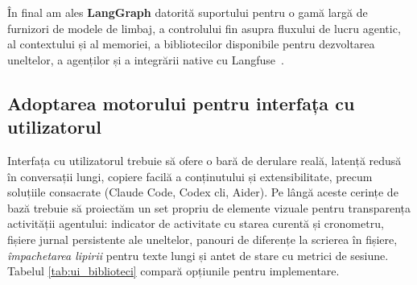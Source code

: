 \documentclass[12pt, a4paper, oneside, romanian]{teza-upb}
\begin{document}
  În final am ales \textbf{LangGraph} datorită suportului pentru o gamă largă de furnizori de modele de limbaj, a controlului fin asupra fluxului de lucru agentic, al contextului și al memoriei, a bibliotecilor disponibile pentru dezvoltarea uneltelor, a agenților și a integrării native cu Langfuse~\cite{web_langfuse}.

  \subsection{Adoptarea motorului pentru interfața cu utilizatorul}

  Interfața cu utilizatorul trebuie să ofere o bară de derulare reală, latență redusă în conversații
  lungi, copiere facilă a conținutului și extensibilitate, precum soluțiile consacrate (Claude Code,
  Codex \ac{cli}, Aider). Pe lângă aceste cerințe de bază trebuie să proiectăm un set propriu de elemente vizuale pentru
  transparența activității agentului: indicator de activitate cu starea curentă și cronometru, fișiere jurnal persistente
  ale uneltelor, panouri de diferențe la scrierea în fișiere, \emph{împachetarea lipirii} pentru
  texte lungi și antet de stare cu metrici de sesiune. Tabelul \ref{tab:ui_biblioteci} compară opțiunile pentru implementare.
\end{document}
